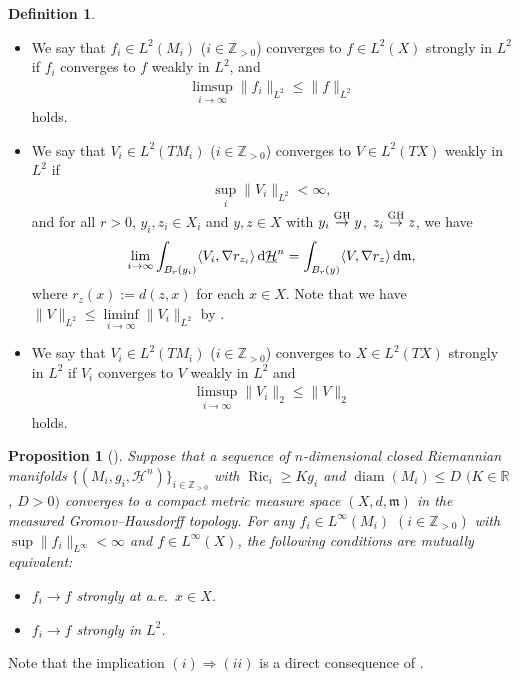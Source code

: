 \documentclass[10pt,a4paper]{amsart}
\numberwithin{equation}{section}
\newtheorem{Prop}[Thm]{Proposition}
\theoremstyle{definition}
\newtheorem{Def}[Thm]{Definition}
\newcommand{\Ric}{\operatorname{Ric}}
\newcommand{\diam}{\operatorname{diam}}
\newcommand{\R}{\mathbb{R}}
\newcommand{\Z}{\mathbb{Z}}
\newcommand{\mf}{\mathfrak{m}}
\newcommand{\nHa}{\underline{\mathcal{H}}}
\begin{document}
\begin{Def}
\begin{itemize}
\begin{gather*}
\end{gather*}
and for all $r>0$, $x_i\in M_i$ and $x\in X$ with $x_i \stackrel{{\rm GH}}{\to} x$, we have
\begin{gather*}
\lim_{i\to \infty}\int_{B_r(x_i)} f_i \,{\rm d}\nHa^n=\int_{B_r(x)} f \,{\rm d}\mf.
\end{gather*}
Note that we have $\|f\|_{L^2}\leq \liminf\limits_{i\to\infty}\|f_i\|_{L^2}$ by \cite[Proposition~3.29]{Ho1}.
\item We say that $f_i\in L^2(M_i)$ ($i\in\Z_{>0}$) converges to $f\in L^2(X)$ strongly in $L^2$ \cite[Definition~3.21 and Proposition~3.31]{Ho1} if $f_i$ converges to $f$ weakly in $L^2$, and
\begin{gather*}
\limsup_{i\to \infty} \|f_i\|_{L^2}\leq \|f\|_{L^2}
\end{gather*}
holds.
\item We say that $V_i\in L^2(T M_i)$ ($i\in\Z_{>0}$) converges to $V\in L^2(T X)$ weakly in $L^2$ \cite[Definition~3.42]{Ho1} if
\begin{gather*}
\sup_{i}\|V_i\|_{L^2}<\infty,
\end{gather*}
and for all $r>0$, $y_i,z_i\in X_i$ and $y,z\in X$ with $y_i\stackrel{{\rm GH}}{\to} y$, $z_i\stackrel{{\rm GH}}\to z$, we have
\begin{gather*}
\lim_{i\to \infty}\int_{B_r(y_i)} \langle V_i, \nabla r_{z_i}\rangle \,{\rm d}\nHa^n=\int_{B_r(y)} \langle V, \nabla r_{z}\rangle \,{\rm d}\mf,
\end{gather*}
where $r_z(x):=d(z,x)$ for each $x\in X$.
Note that we have $\|V\|_{L^2}\leq \liminf\limits_{i\to \infty}\|V_i\|_{L^2}$ by \cite[Proposition~3.64]{Ho1}.
\item We say that $V_i\in L^2(T M_i)$ ($i\in\Z_{>0}$) converges to $X\in L^2(T X)$ strongly in $L^2$ \cite[Definition~3.58 and~Proposition~3.66]{Ho1} if $V_i$ converges to $V$ weakly in $L^2$ and
\begin{gather*}
\limsup_{i\to \infty} \|V_i\|_2\leq \|V\|_2
\end{gather*}
holds.
\end{itemize}

\end{Def}
\begin{Prop}[{\cite[Proposition~3.32]{Ho1}}]\label{eqconv}
Suppose that a sequence of $n$-dimensional closed Riemannian manifolds $\{(M_i,g_i,\nHa^n)\}_{i\in \Z_{>0}}$ with $\Ric_i\geq K g_i$ and $\diam (M_i)\leq D$ $(K\in \R$, \mbox{$D>0)$} converges to a compact metric measure space $(X,d,\mf)$ in the measured Gromov--Hausdorff topo\-logy.
For any $f_i\in L^\infty(M_i)$ $(i\in\Z_{>0})$ with $\sup\|f_i\|_{L^\infty}<\infty$ and $f\in L^\infty (X)$, the following conditions are mutually equivalent:
\begin{itemize}\itemsep=0pt
\item[$(i)$] $f_i\to f$ strongly at a.e.\ $x\in X$.
\item[$(ii)$] $f_i\to f$ strongly in $L^2$.
\end{itemize}
\end{Prop}
Note that the implication $(i)\Rightarrow (ii)$ is a direct consequence of \cite[Definitions~3.21 and~3.25, Proposition~3.24]{Ho1}.
\end{document}

